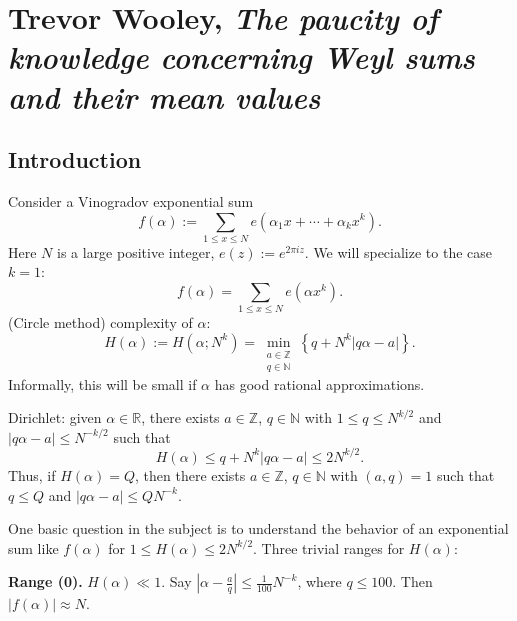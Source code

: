 \documentclass[reqno]{amsart} 
\numberwithin{theorem}{section}
\numberwithin{equation}{section}
\begin{document}
\section{Trevor Wooley, \emph{The paucity of knowledge concerning Weyl sums and their mean values}}

\subsection{Introduction}

Consider a Vinogradov exponential sum
\begin{equation*}
  f(\alpha) := \sum_{1 \leq x \leq N} e(\alpha_1 x + \dotsb + \alpha_k x^k).
\end{equation*}
Here $N$ is a large positive integer, $e(z) := e^{2 \pi i z}$.  We will specialize to the case $k = 1$:
\begin{equation*}
  f(\alpha) = \sum_{1 \leq x \leq N} e(\alpha x^k).
\end{equation*}
(Circle method) complexity of $\alpha$:
\begin{equation*}
  H(\alpha) :=
  H(\alpha; N^k)
  =
  \min_{
    \substack{
      a \in \mathbb{Z}  \\
      q \in \mathbb{N}
    }
  }
  \left\{ q + N^k \lvert q \alpha - a \rvert \right\}.
\end{equation*}
Informally, this will be small if $\alpha$ has good rational approximations.

Dirichlet: given $\alpha \in \mathbb{R}$, there exists $a \in \mathbb{Z}$, $q \in \mathbb{N}$ with $1 \leq q \leq N^{k/2}$ and $\lvert q \alpha - a \rvert \leq N^{- k/2}$ such that
\begin{equation*}
  H(\alpha) \leq q + N^k \lvert q \alpha - a \rvert \leq 2 N^{k/2}.
\end{equation*}
Thus, if $H(\alpha) = Q$, then there exists $a \in \mathbb{Z}$, $q \in \mathbb{N}$ with $(a, q) = 1$ such that $q \leq Q$ and $\lvert q \alpha - a \rvert \leq Q N^{- k}$.

One basic question in the subject is to understand the behavior of an exponential sum like $f(\alpha)$ for $1 \leq H(\alpha) \leq 2 N^{k/2}$.  Three trivial ranges for $H(\alpha)$:

\textbf{Range (0).}
$H(\alpha) \ll 1$.  Say $\left\lvert \alpha - \tfrac{a}{q} \right\rvert \leq \frac{1}{100} N^{- k}$, where $q \leq 100$.  Then $\lvert f(\alpha) \rvert \approx N$.
\end{document}
